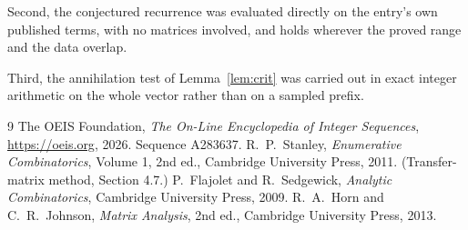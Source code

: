 \documentclass[11pt,a4paper]{article}
\theoremstyle{plain}
\theoremstyle{definition}
\begin{document}
Second, the conjectured recurrence was evaluated directly on the entry's own published terms,
with no matrices involved, and holds wherever the proved range and the data overlap.

Third, the annihilation test of Lemma~\ref{lem:crit} was carried out in exact integer
arithmetic on the whole vector rather than on a sampled prefix.

\begin{thebibliography}{9}
 The OEIS Foundation, \emph{The On-Line Encyclopedia of Integer
Sequences}, \url{https://oeis.org}, 2026. Sequence A283637.
 R.~P.~Stanley, \emph{Enumerative Combinatorics}, Volume 1, 2nd ed.,
Cambridge University Press, 2011. (Transfer-matrix method, Section 4.7.)
 P.~Flajolet and R.~Sedgewick, \emph{Analytic Combinatorics}, Cambridge
University Press, 2009.
 R.~A.~Horn and C.~R.~Johnson, \emph{Matrix Analysis}, 2nd ed., Cambridge
University Press, 2013.
\end{thebibliography}
\end{document}
